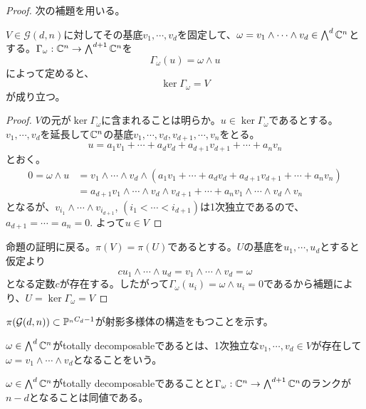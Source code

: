 \documentclass{ltjsreport}
\begin{document}
\begin{proof}
  次の補題を用いる。
  \begin{lemm}\label{ker_wedge}
    $V\in\mathcal{G}(d,n)$に対してその基底$v_1,\cdots,v_d$を固定して、$\omega=v_1\wedge\cdots\wedge v_d\in\bigwedge^d\mathbb{C}^n$とする。$\Gamma_\omega:\mathbb{C}^n\rightarrow \bigwedge^{d+1}\mathbb{C}^n$を
    \[
    \Gamma_\omega(u)=\omega\wedge u  
    \]
    によって定めると、
    \begin{equation*}
      \ker\Gamma_\omega =V
    \end{equation*}
    が成り立つ。
  \end{lemm}
  
  \begin{proof}
    $V$の元が$\ker\Gamma_\omega$に含まれることは明らか。$u\in\ker\Gamma_\omega$であるとする。$v_1,\cdots,v_d$を延長して$\mathbb{C}^n$の基底$v_1,\cdots,v_d,v_{d+1},\cdots,v_n$をとる。
    \[
    u=a_{1}v_1+\cdots+a_{d}v_d+a_{d+1}v_{d+1}+\cdots+a_nv_n  
    \]
    とおく。
    \begin{align*}
    0=\omega\wedge u
    &=v_1\wedge\cdots\wedge v_d\wedge(a_{1}v_1+\cdots+a_{d}v_d+a_{d+1}v_{d+1}+\cdots+a_nv_n )  \\
    &=a_{d+1}v_1\wedge\cdots\wedge v_d\wedge v_{d+1}
        +\cdots+
      a_{n}v_1\wedge\cdots\wedge v_d\wedge v_{n}
    \end{align*}
    となるが、$v_{i_1}\wedge\cdots\wedge v_{i_{d+1}}$, $(i_1<\cdots<i_{d+1})$は1次独立であるので、$a_{d+1}=\cdots=a_n=0$. よって$u\in V$
  \end{proof}

  命題の証明に戻る。$\pi(V)=\pi(U)$であるとする。$U$の基底を$u_1,\cdots,u_d$とすると仮定より
  \[
  cu_1\wedge\cdots\wedge u_d=v_1\wedge\cdots\wedge v_d=\omega  
  \]
  となる定数$c$が存在する。したがって$\Gamma_\omega(u_i)=\omega\wedge u_i=0$であるから補題により、$U=\ker\Gamma_\omega= V$
\end{proof}
  
$\pi(\mathcal{G}(d,n))\subset\mathbb{P}^{_{n}C_{d}-1}$が射影多様体の構造をもつことを示す。

\begin{defin}
  $\omega\in\bigwedge^d \mathbb{C}^n$がtotally decomposableであるとは、1次独立な$v_1,\cdots,v_d\in V$が存在して$\omega=v_1\wedge\cdots\wedge v_d$となることをいう。
\end{defin}

\begin{lemm}\label{totally_decomposable}
  $\omega\in\bigwedge^d \mathbb{C}^n$がtotally decomposableであることと$\Gamma_\omega:\mathbb{C}^n\rightarrow\bigwedge^{d+1}\mathbb{C}^n$のランクが$n-d$となることは同値である。
\end{lemm}
\end{document}
